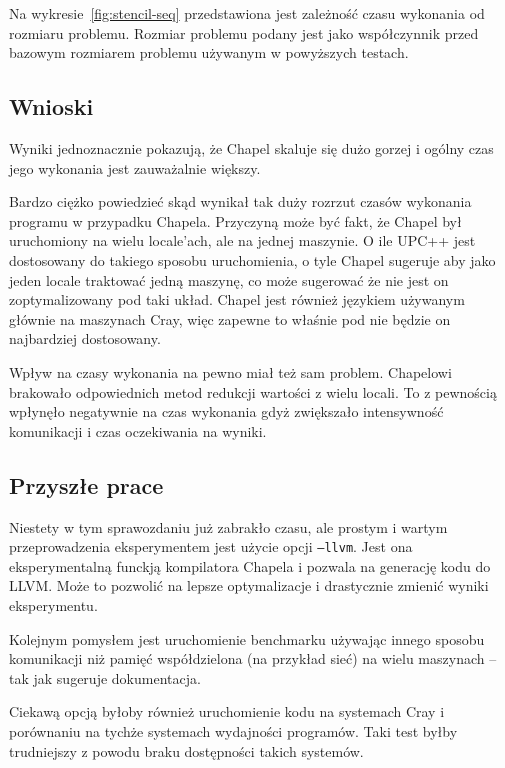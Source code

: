 Na wykresie~\ref{fig:stencil-seq} przedstawiona jest zależność czasu
wykonania od rozmiaru problemu.
Rozmiar problemu podany jest jako współczynnik przed bazowym rozmiarem
problemu używanym w powyższych testach.

\subsection{Wnioski}

Wyniki jednoznacznie pokazują, że Chapel skaluje się dużo gorzej i
ogólny czas jego wykonania jest zauważalnie większy.

Bardzo ciężko powiedzieć skąd wynikał tak duży rozrzut czasów wykonania
programu w przypadku Chapela.
Przyczyną może być fakt, że Chapel był uruchomiony na wielu
locale'ach, ale na jednej maszynie.
O ile UPC++ jest dostosowany do takiego sposobu uruchomienia,
o tyle Chapel sugeruje aby jako jeden locale traktować jedną maszynę,
co może sugerować że nie jest on zoptymalizowany pod taki układ.
Chapel jest również językiem używanym głównie na maszynach Cray,
więc zapewne to właśnie pod nie będzie on najbardziej dostosowany.

Wpływ na czasy wykonania na pewno miał też sam problem.
Chapelowi brakowało odpowiednich metod redukcji wartości z wielu locali.
To z pewnością wpłynęło negatywnie na czas wykonania gdyż zwiększało
intensywność komunikacji i czas oczekiwania na wyniki.

\subsection{Przyszłe prace}

Niestety w tym sprawozdaniu już zabrakło czasu,
ale prostym i wartym przeprowadzenia eksperymentem jest
użycie opcji \texttt{--llvm}.
Jest ona eksperymentalną funckją kompilatora Chapela i pozwala na
generację kodu do LLVM\@.
Może to pozwolić na lepsze optymalizacje i drastycznie zmienić wyniki
eksperymentu.

Kolejnym pomysłem jest uruchomienie benchmarku używając innego
sposobu komunikacji niż pamięć współdzielona (na przykład sieć)
na wielu maszynach -- tak jak sugeruje dokumentacja.

Ciekawą opcją byłoby również uruchomienie kodu na systemach Cray
i porównaniu na tychże systemach wydajności programów.
Taki test byłby trudniejszy
z powodu braku dostępności takich systemów.
